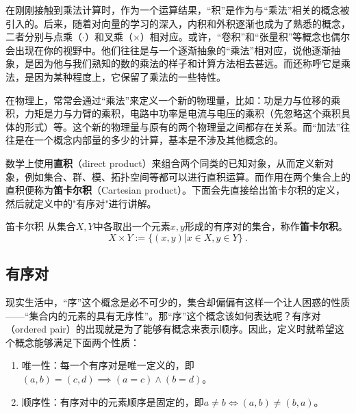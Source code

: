 

在刚刚接触到乘法计算时，作为一个运算结果，“积”是作为与“乘法”相关的概念被引入的。后来，随着对向量的学习的深入，内积和外积逐渐也成为了熟悉的概念，二者分别与点乘（$\cdot$）和叉乘（$\times$）相对应。或许，“卷积”和“张量积”等概念也偶尔会出现在你的视野中。他们往往是与一个逐渐抽象的“乘法”相对应，说他逐渐抽象，是因为他与我们熟知的数的乘法的样子和计算方法相去甚远。而还称呼它是乘法，是因为某种程度上，它保留了乘法的一些特性。

在物理上，常常会通过“乘法”来定义一个新的物理量，比如：功是力与位移的乘积，力矩是力与力臂的乘积，电路中功率是电流与电压的乘积（先忽略这个乘积具体的形式）等。这个新的物理量与原有的两个物理量之间都存在关系。而“加法”往往是在一个概念内部量的多少的计算，基本是不涉及其他概念的。

数学上使用\textbf{直积}（direct product）来组合两个同类的已知对象，从而定义新对象，例如集合、群、模、拓扑空间等都可以进行直积运算。而作用在两个集合上的直积便称为\textbf{笛卡尔积}（Cartesian product）。下面会先直接给出笛卡尔积的定义，然后就定义中的"有序对"进行讲解。

\begin{definition}{笛卡尔积}\label{def_CartPr_1}
从集合$X,Y$中各取出一个元素$x,y$形成的有序对的集合，称作\textbf{笛卡尔积}。
\begin{equation}
X\times Y:=\{(x,y)|x\in X,y\in Y\}~.
\end{equation}

\end{definition}

\subsection{有序对}

现实生活中，“序”这个概念是必不可少的，集合却偏偏有这样一个让人困惑的性质——“集合内的元素的具有无序性”。那“序”这个概念该如何表达呢？有序对（ordered pair）的出现就是为了能够有概念来表示顺序。因此，定义时就希望这个概念能够满足下面两个性质：

\begin{enumerate}
\item 唯一性：每一个有序对是唯一定义的，即$(a, b) = (c, d)\implies (a = c) \land (b = d)$。
\item 顺序性：有序对中的元素顺序是固定的，即$a\neq b\iff(a, b)\neq (b, a)$。
\end{enumerate}

